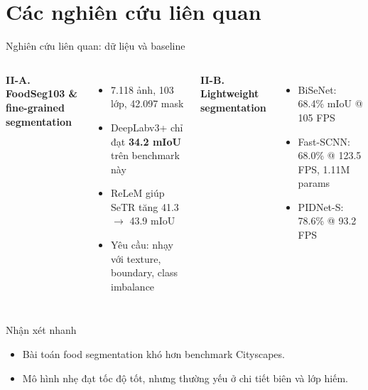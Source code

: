 \section{Các nghiên cứu liên quan}

\begin{frame}{Nghiên cứu liên quan: dữ liệu và baseline}
  \begin{columns}
      \textbf{II-A. FoodSeg103 \& fine-grained segmentation}
      \begin{itemize}
        \item 7.118 ảnh, 103 lớp, 42.097 mask \cite{benchmarkfood}
        \item DeepLabv3+ chỉ đạt \textbf{34.2 mIoU} trên benchmark này \cite{benchmarkfood,chen2017deeplab}
        \item ReLeM giúp SeTR tăng 41.3 $\to$ 43.9 mIoU \cite{benchmarkfood,zheng2021setr}
        \item Yêu cầu: nhạy với texture, boundary, class imbalance
      \end{itemize}
      \textbf{II-B. Lightweight segmentation}
      \begin{itemize}
        \item BiSeNet: 68.4\% mIoU @ 105 FPS \cite{bisenet}
        \item Fast-SCNN: 68.0\% @ 123.5 FPS, 1.11M params \cite{poudel2019fastscnn}
        \item PIDNet-S: 78.6\% @ 93.2 FPS \cite{xu2023pidnet}
      \end{itemize}
    

  \end{columns}
    \begin{block}{Nhận xét nhanh}
        \begin{itemize}
          \item Bài toán food segmentation khó hơn benchmark Cityscapes.
          \item Mô hình nhẹ đạt tốc độ tốt, nhưng thường yếu ở chi tiết biên và lớp hiếm.
        \end{itemize}
      \end{block}
\end{frame}

